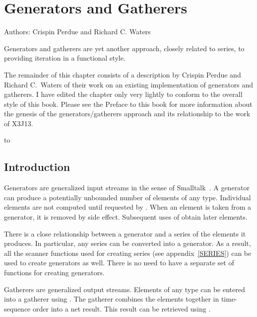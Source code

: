 

\clearpage\def\pagestatus{FINAL PROOF}

\chapter{Generators and Gatherers}
\label{GENERATORS}

Authors: Crispin Perdue and Richard C. Waters

\begin{new}
\prefaceword  Generators and gatherers are yet another
approach, closely related to series,
to providing iteration in a functional style.

The remainder of this chapter consists of a description by Crispin Perdue
and Richard C.~Waters of their work on an existing implementation of
generators and gatherers.  I have edited the chapter only very lightly to
conform to the overall style of this book.  Please see the Preface to this
book for more information about the genesis of the generators/gatherers
approach and its relationship to the work of X3J13.

\noindent\hbox to \textwidth{\hss---Guy L. Steele Jr.}

\section{Introduction}

Generators are generalized input streams in the sense of
Smalltalk~\cite{SMALLTALK-80-BOOK}.  A generator can produce a potentially
unbounded number of elements of any type.  Individual elements are not
computed until requested by .  When an element is taken from
a generator, it is removed by side effect.  Subsequent uses of 
 obtain later elements.

There is a close relationship between a generator and a series of the
elements it produces.  In particular, any series can be converted into
a generator.  As a result, all the scanner functions used for
creating series (see appendix~\ref{SERIES}) can be used to create
generators as well.  There is no need to have a separate
set of functions for creating generators.

Gatherers are generalized output streams.  Elements of any type can be
entered into a gatherer using .  The gatherer combines the
elements together in time-sequence order into a net result.  This result can
be retrieved using .


\end{new}
